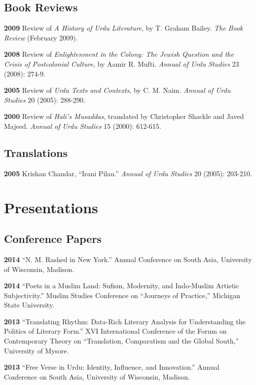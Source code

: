 \documentclass[letterpaper,12pt]{article}
\begin{document}
\subsection{Book Reviews%
  \label{book-reviews}%
}

\textbf{2009}
Review of \emph{A History of Urdu Literature},
by T. Graham Bailey.
\emph{The Book Review} (February 2009).

\textbf{2008}
Review of \emph{Enlightenment in the Colony:
The Jewish Question and the Crisis of Postcolonial Culture},
by Aamir R. Mufti.
\emph{Annual of Urdu Studies} 23 (2008): 274-9.

\textbf{2005}
Review of \emph{Urdu Texts and Contexts},
by C. M. Naim.
\emph{Annual of Urdu Studies} 20 (2005): 288-290.

\textbf{2000}
Review of \emph{Hali’s Musaddas},
translated by Christopher Shackle and Javed Majeed.
\emph{Annual of Urdu Studies} 15 (2000): 612-615.


\subsection{Translations%
  \label{translations}%
}

\textbf{2005} Krishan Chandar, “Irani Pilau.”
\emph{Annual of Urdu Studies} 20 (2005): 203-210.


\section{Presentations%
  \label{presentations}%
}


\subsection{Conference Papers%
  \label{conference-papers}%
}

\textbf{2014}
“N. M. Rashed in New York.”
Annual Conference on South Asia,
University of Wisconsin, Madison.

\textbf{2014}
“Poets in a Muslim Land:
Sufism, Modernity, and Indo-Muslim Artistic Subjectivity.”
Muslim Studies Conference on “Journeys of Practice,”
Michigan State University.

\textbf{2013}
“Translating Rhythm:
Data-Rich Literary Analysis for Understanding the Politics of Literary Form.”
XVI International Conference of the Forum on Contemporary Theory on
“Translation, Comparatism and the Global South,” University of Mysore.

\textbf{2013}
“Free Verse in Urdu: Identity, Influence, and Innovation.”
Annual Conference on South Asia, University of Wisconsin, Madison.
\end{document}

